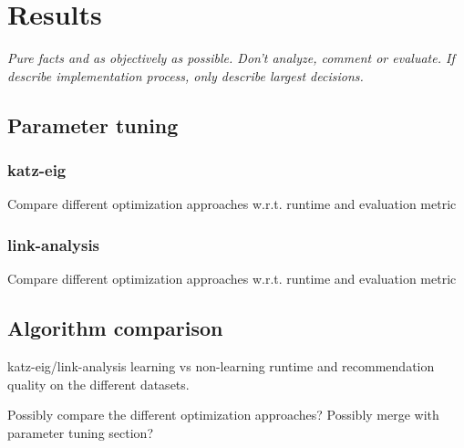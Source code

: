 \chapter{Results}\label{cha:Results}

\textit{Pure facts and as objectively as possible. Don't analyze, comment or evaluate.  If describe implementation process, only describe largest decisions.}


\newpage


\newpage




\newpage


\newpage


\newpage


\section{Parameter tuning}

\subsection{katz-eig}

Compare different optimization approaches w.r.t. runtime and evaluation metric

\subsection{link-analysis}

Compare different optimization approaches w.r.t. runtime and evaluation metric


\section{Algorithm comparison}

katz-eig/link-analysis learning vs non-learning runtime and recommendation quality on the different datasets.

Possibly compare the different optimization approaches? Possibly merge with parameter tuning section?


%

%






